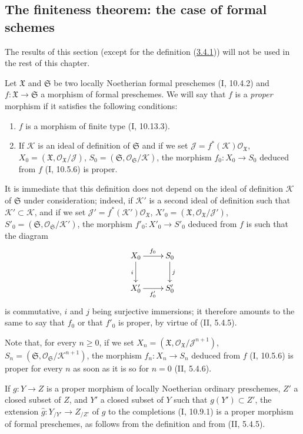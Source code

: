 \subsection{The finiteness theorem: the case of formal schemes}
\label{subsection:III.3.4}

The results of this section (except for the definition
(\hyperref[III.3.4.1]{3.4.1})) will not be used in the rest of this
chapter.

\begin{env}[3.4.1]
\label{III.3.4.1}
Let $\mathfrak X$ and $\mathfrak S$ be two locally Noetherian formal
preschemes (I, 10.4.2) and $f:\mathfrak X\to\mathfrak S$ a morphism of
formal preschemes. We will say that $f$ is a \emph{proper} morphism if it
satisfies the following conditions:
\begin{enumerate}
\item[$1^\circ$] $f$ is a morphism of finite type (I, 10.13.3).
\item[$2^\circ$] If $\mathcal K$ is an ideal of definition of $\mathfrak S$
and if we set
$\mathcal J=f^*(\mathcal K)\mathcal O_{\mathfrak X}$,
$X_0=(\mathfrak X,\mathcal O_{\mathfrak X}/\mathcal J)$,
$S_0=(\mathfrak S,\mathcal O_{\mathfrak S}/\mathcal K)$, the morphism
$f_0:X_0\to S_0$ deduced from $f$ (I, 10.5.6) is proper.
\end{enumerate}

It is immediate that this definition does not depend on the ideal of
definition $\mathcal K$ of $\mathfrak S$ under consideration; indeed, if
$\mathcal K'$ is a second ideal of definition such that
$\mathcal K'\subset\mathcal K$, and if we set
$\mathcal J'=f^*(\mathcal K')\mathcal O_{\mathfrak X}$,
$X'_0=(\mathfrak X,\mathcal O_{\mathfrak X}/\mathcal J')$,
$S'_0=(\mathfrak S,\mathcal O_{\mathfrak S}/\mathcal K')$, the morphism
$f'_0:X'_0\to S'_0$ deduced from $f$ is such that the diagram
\[
\xymatrix{
X_0\ar[r]^{f_0}\ar[d]_i & S_0\ar[d]^j\\
X'_0\ar[r]_{f'_0} & S'_0
}
\]
is commutative, $i$ and $j$ being surjective immersions; it therefore amounts
to the same to say that $f_0$ or that $f'_0$ is proper, by virtue of (II, 5.4.5).

Note that, for every $n\geq0$, if we set
$X_n=(\mathfrak X,\mathcal O_{\mathfrak X}/\mathcal J^{n+1})$,
$S_n=(\mathfrak S,\mathcal O_{\mathfrak S}/\mathcal K^{n+1})$, the morphism
$f_n:X_n\to S_n$ deduced from $f$ (I, 10.5.6) is proper for every $n$ as soon
as it is so for $n=0$ (II, 5.4.6).

If $g:Y\to Z$ is a proper morphism of locally Noetherian ordinary
preschemes, $Z'$ a closed subset of $Z$, and $Y'$ a closed subset of $Y$
such that $g(Y')\subset Z'$, the extension
$\widehat g:Y_{/Y'}\to Z_{/Z'}$ of $g$ to the completions (I, 10.9.1) is a
proper morphism of formal preschemes, as follows from the definition and
from (II, 5.4.5).


\end{env}
